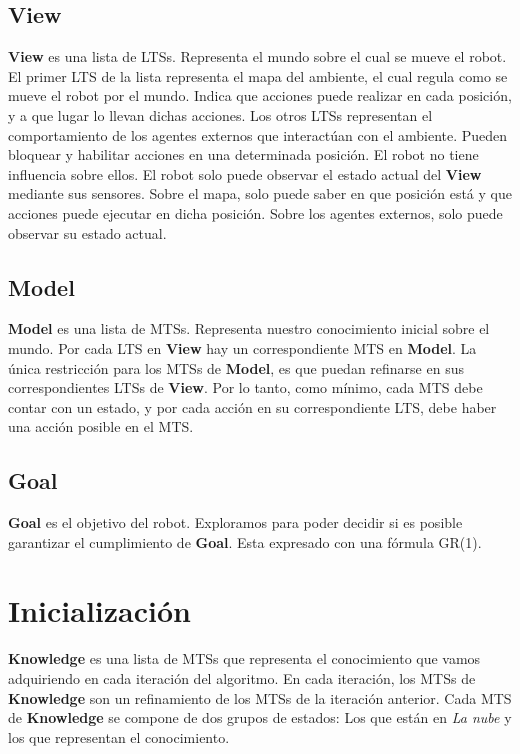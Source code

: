 \subsection{View}
\textbf{View} es una lista de LTSs. Representa el mundo sobre el cual se mueve el robot.
El primer LTS de la lista representa el mapa del ambiente, el cual regula como se mueve el robot por el mundo. Indica que acciones
puede realizar en cada posición, y a que lugar lo llevan dichas acciones.
Los otros LTSs representan el comportamiento de los agentes externos que interactúan con el ambiente. Pueden bloquear y habilitar
acciones en una determinada posición. El robot no tiene influencia sobre ellos.
El robot solo puede observar el estado actual del \textbf{View} mediante sus sensores. Sobre el mapa, solo puede saber en que posición está
y que acciones puede ejecutar en dicha posición. Sobre los agentes externos, solo puede observar su estado actual.

\subsection{Model}
\textbf{Model} es una lista de MTSs. Representa nuestro conocimiento inicial sobre el mundo. Por cada LTS en \textbf{View} hay un correspondiente MTS
en \textbf{Model}.
La única restricción para los MTSs de \textbf{Model}, es que puedan refinarse en sus correspondientes LTSs de \textbf{View}. Por lo tanto, como mínimo,
cada MTS debe contar con un estado, y por cada acción en su correspondiente LTS, debe haber una acción posible en el MTS.

\subsection{Goal}
\textbf{Goal} es el objetivo del robot. Exploramos para poder decidir si es posible garantizar el cumplimiento de \textbf{Goal}. Esta expresado con una 
fórmula GR\big(1\big).

\section{Inicialización}

\textbf{Knowledge} es una lista de MTSs que representa el conocimiento que vamos adquiriendo en cada iteración del algoritmo. En cada iteración, los MTSs
de \textbf{Knowledge} son un refinamiento de los MTSs de la iteración anterior. Cada MTS de \textbf{Knowledge} se compone de dos grupos de estados: Los
que están en \textit{La nube} y los que representan el conocimiento.

